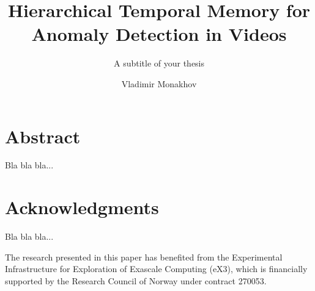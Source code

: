 \documentclass[USenglish]{ifimaster}  %
\title{Hierarchical Temporal Memory for Anomaly Detection in Videos}
\subtitle{A subtitle of your thesis }         %
\author{Vladimir Monakhov}                      %
\begin{document}
\duoforside[
  dept={Department of Informatics},   %
  program={Informatics: Robotics and Intelligent Systems},         %
  long
]                                        %

\frontmatter{}
\mainmatter{}

\chapter*{Abstract} 
Bla bla bla...
\chapter*{Acknowledgments} 
Bla bla bla...
\par
The research presented in this paper has benefited from the Experimental Infrastructure for Exploration of Exascale Computing (eX3), which is financially supported by the Research Council of Norway under contract 270053.

\tableofcontents

\mainmatter






\backmatter{}
\printbibliography
\end{document}
